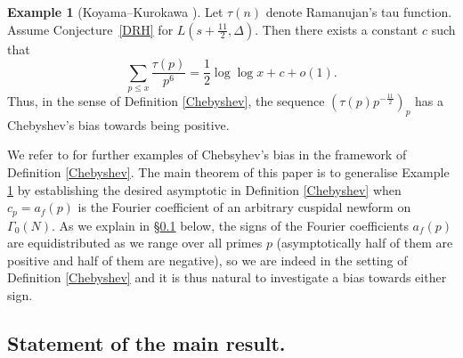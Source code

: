 \documentclass[12pt,reqno]{amsart}
\theoremstyle{definition}
\newtheorem{example}[theorem]{Example}
\numberwithin{equation}{section}
\begin{document}
\begin{example}[{Koyama--Kurokawa \cite[Theorem~2]{KK22}}]\label{tau}
Let $\tau(n)$ denote Ramanujan's tau function. Assume Conjecture~\ref{DRH} for $L(s+\frac{11}{2}, \Delta)$. Then there exists a constant $c$ such that
\begin{equation*}
\sum_{p \leqslant x} \frac{\tau(p)}{p^{6}} = \frac{1}{2} \log \log x+c+o(1).
\end{equation*}
Thus, in the sense of Definition \ref{Chebyshev}, the sequence $(\tau(p) p^{-\frac{11}{2}})_p$ has a Chebyshev's bias towards being positive. 
\end{example}

We refer to \cite{AokiKoyama2023, KanekoKoyama2023, Okumura2024} for further examples of Chebsyhev's bias in the framework of Definition \ref{Chebyshev}. The main theorem of this paper is to generalise Example \ref{tau} by establishing the desired asymptotic in Definition \ref{Chebyshev} when $c_p=a_f(p)$ is the Fourier coefficient of an arbitrary cuspidal newform on $\Gamma_0(N)$. As we explain in \S \ref{statement} below, the signs of the Fourier coefficients $a_f(p)$ are equidistributed as we range over all primes $p$ (asymptotically half of them are positive and half of them are negative), so we are indeed in the setting of Definition \ref{Chebyshev} and it is thus natural to investigate a bias towards either sign. 

\subsection{Statement of the main result.} \label{statement}
\end{document}
